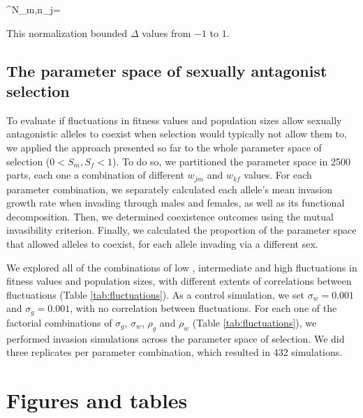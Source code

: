 \documentclass[12pt]{article}
\let\oldequation\equation
\let\oldendequation\endequation
\renewenvironment{equation}
  {\linenomathNonumbers\oldequation}
  {\oldendequation\endlinenomath}
\begin{document}
\begin{equation}
  \Delta^{N_{m,n}}_{j}= 
\end{equation}

This normalization bounded $\Delta$ values from $-1$ to $1$.

\subsection*{The parameter space of sexually antagonist selection}

To evaluate if fluctuations in fitness values and population sizes allow sexually antagonistic alleles to coexist when selection would typically not allow them to, we applied the approach presented so far to the whole parameter space of selection  ($ 0 < S_{m}, S_{f} < 1$). To do so, we partitioned the parameter space in 2500 parts, each one a combination of different $w_{jm}$ and $w_{kf}$ values. For each parameter combination, we separately calculated each allele's mean invasion growth rate when invading through males and females, as well as its functional decomposition. Then, we determined coexistence outcomes using the mutual invasibility criterion. Finally, we calculated the proportion of the parameter space that allowed alleles to coexist, for each allele invading via a different sex.

We explored all of  the combinations of low , intermediate  and high fluctuations  in fitness values and population sizes, with different extents of correlations between fluctuations (Table \ref{tab:fluctuations}).  As a control simulation, we set $\sigma_{w}= 0.001$ and  $\sigma_{g}=0.001$, with no correlation between fluctuations. For each one of the factorial combinations of $\sigma_{g}$, $\sigma_{w}$, $\rho_{g}$ and $\rho_{w}$ (Table \ref{tab:fluctuations}), we performed invasion simulations across the parameter space of selection. We did three replicates per parameter combination, which resulted in 432 simulations.





\section*{Figures and tables }
\end{document}
